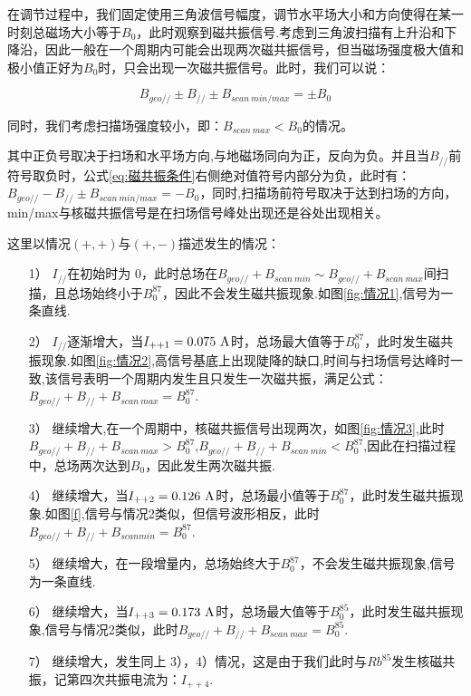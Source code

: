 \documentclass[10pt,hyperref,a4paper,UTF8]{ctexart}
\newcommand{\pll}{/\!/}
\begin{document}
                \noindent
                在调节过程中，我们固定使用三角波信号幅度，调节水平场大小和方向使得在某一时刻总磁场大小等于$B_{0}$，此时观察到磁共振信号.考虑到三角波扫描有上升沿和下降沿，因此一般在一个周期内可能会出现两次磁共振信号，但当磁场强度极大值和极小值正好为$B_{0}$时，只会出现一次磁共振信号。此时，我们可以说：

                \begin{equation}\label{eq:磁共振条件}
                        B_{geo\pll} \pm B_{\pll} \pm B_{scan\ min/max} = \pm B_0
                \end{equation}

                同时，我们考虑扫描场强度较小，即：$B_{scan\ max} < B_0$的情况。

                其中正负号取决于扫场和水平场方向,与地磁场同向为正，反向为负。并且当$B_{\pll}$前符号取负时，公式\ref{eq:磁共振条件}右侧绝对值符号内部分为负，此时有：$B_{geo\pll} - B_{\pll} \pm B_{scan\ min/max} = -B_0$，同时,扫描场前符号取决于达到扫场的方向， min/max与核磁共振信号是在扫场信号峰处出现还是谷处出现相关。

                这里以情况$(+,+)$与$(+,-)$描述发生的情况：
                \begin{itemize}
                        \item[1）] $I_{\pll}$在初始时为 0，此时总场在$B_{geo\pll}+B_{scan\ min} \sim B_{geo\pll}+B_{scan\ max} $间扫描，且总场始终小于$B^{87}_0$，因此不会发生磁共振现象.如图\ref{fig:情况1},信号为一条直线.
                        \item[2）] $I_{\pll}$逐渐增大，当$I_{++1}=0.075\ \rm A$时，总场最大值等于$B^{87}_{0}$，此时发生磁共振现象.如图\ref{fig:情况2},高信号基底上出现陡降的缺口,时间与扫场信号达峰时一致,该信号表明一个周期内发生且只发生一次磁共振，满足公式：$B_{geo\pll} + B_{\pll} + B_{scan\ max} = B^{87}_0$.
                        \item[3）] 继续增大,在一个周期中，核磁共振信号出现两次，如图\ref{fig:情况3},此时$B_{geo\pll} + B_{\pll} + B_{scan\ max} > B^{87}_0$,$B_{geo\pll} + B_{\pll} + B_{scan\ min} < B^{87}_0$,因此在扫描过程中，总场两次达到$B_0$，因此发生两次磁共振.
                        \item[4）] 继续增大，当$I_{++2}=0.126\ \rm A$时，总场最小值等于$B^{87}_{0}$，此时发生磁共振现象.如图\ref{f},信号与情况2类似，但信号波形相反，此时$B_{geo\pll} + B_{\pll} + B_{scan min} = B^{87}_0$.
                        \item[5）] 继续增大，在一段增量内，总场始终大于$B^87_0$，不会发生磁共振现象,信号为一条直线.
                        \item[6）] 继续增大，当$I_{++3}=0.173\ \rm A$时，总场最大值等于$B^{85}_{0}$，此时发生磁共振现象,信号与情况2类似，此时$B_{geo\pll} + B_{\pll} + B_{scan\ max} = B^{85}_0$. 
                        \item[7）] 继续增大，发生同上 3），4）情况，这是由于我们此时与$Rb^{85}$发生核磁共振，记第四次共振电流为：$I_{++4}$.
                \end{itemize}
\end{document}
